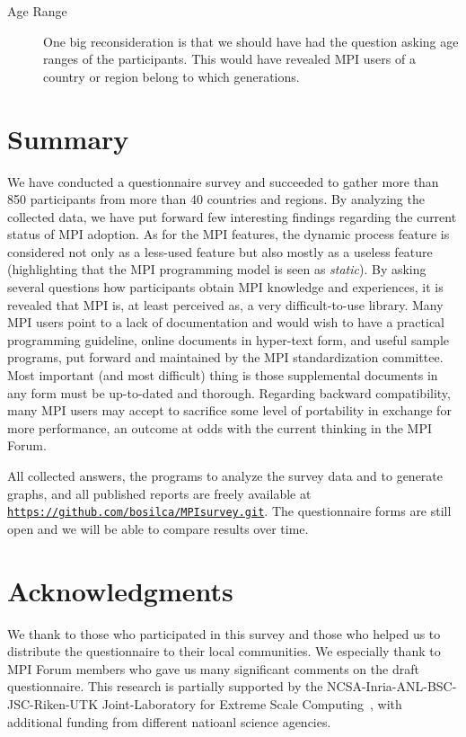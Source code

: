 \documentclass[preprint,5p,times]{elsarticle}
\newcommand{\revision}[2]{{\color{blue}#2}}
\begin{document}
{{\begin{description}
\item[Age Range]
One big reconsideration is that we should have had the question asking
age ranges of the participants. This would have revealed MPI users
of a country or region belong to which generations.

\end{description}
}

\section{Summary}

We have conducted a questionnaire survey and succeeded to gather more than 850
participants from more than 40 countries and regions. By analyzing the collected
data, we have put forward few interesting findings regarding the current status
of MPI adoption. As for the MPI features, the dynamic process feature is
considered not only as a less-used feature but also mostly as a useless feature
(highlighting that the MPI programming model is seen as {\em static}). By asking
several questions how participants obtain MPI knowledge and experiences, it is
revealed that MPI is, at least perceived as\revision{}{,} a very difficult-to-use library.
 Many MPI users point to a lack of
documentation and would wish to have a practical programming guideline, online
documents in hyper-text form, and useful sample programs, put forward and
maintained by the MPI standardization committee. Most important (and most
difficult) thing is those supplemental documents in any form must be up-to-dated
and thorough. Regarding backward compatibility, many MPI users may accept to
sacrifice some level of portability in exchange for more performance, an outcome
at odds with the current thinking in the MPI Forum.

All collected answers, the programs to analyze the survey data and to
generate graphs, and all published reports are freely available at
{\tt \url{https://github.com/bosilca/MPIsurvey.git}}.
\revision{}{The
questionnaire forms are still open and we will be able to compare
results over time.}

\section*{Acknowledgments}

We thank to those who participated in this survey and those who helped us to
distribute the questionnaire to their local communities. We especially thank to
MPI Forum members who gave us many significant comments on the draft
questionnaire. This research is partially supported by the
NCSA-Inria-ANL-BSC-JSC-Riken-UTK Joint-Laboratory for Extreme Scale
Computing~\cite{JLESC}, with additional funding from different natioanl science
agencies.

}
\end{document}
